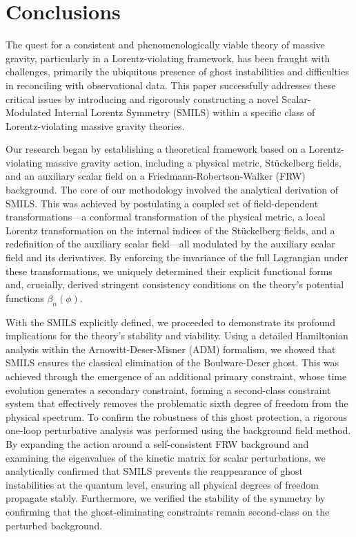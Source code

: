 \documentclass[twocolumn]{aastex631}
\begin{document}
\section{Conclusions}
\label{sec:conclusions}
The quest for a consistent and phenomenologically viable theory of massive gravity, particularly in a Lorentz-violating framework, has been fraught with challenges, primarily the ubiquitous presence of ghost instabilities and difficulties in reconciling with observational data. This paper successfully addresses these critical issues by introducing and rigorously constructing a novel Scalar-Modulated Internal Lorentz Symmetry (SMILS) within a specific class of Lorentz-violating massive gravity theories.

Our research began by establishing a theoretical framework based on a Lorentz-violating massive gravity action, including a physical metric, Stückelberg fields, and an auxiliary scalar field on a Friedmann-Robertson-Walker (FRW) background. The core of our methodology involved the analytical derivation of SMILS. This was achieved by postulating a coupled set of field-dependent transformations—a conformal transformation of the physical metric, a local Lorentz transformation on the internal indices of the Stückelberg fields, and a redefinition of the auxiliary scalar field—all modulated by the auxiliary scalar field and its derivatives. By enforcing the invariance of the full Lagrangian under these transformations, we uniquely determined their explicit functional forms and, crucially, derived stringent consistency conditions on the theory's potential functions $\beta_n(\phi)$.

With the SMILS explicitly defined, we proceeded to demonstrate its profound implications for the theory's stability and viability. Using a detailed Hamiltonian analysis within the Arnowitt-Deser-Misner (ADM) formalism, we showed that SMILS ensures the classical elimination of the Boulware-Deser ghost. This was achieved through the emergence of an additional primary constraint, whose time evolution generates a secondary constraint, forming a second-class constraint system that effectively removes the problematic sixth degree of freedom from the physical spectrum. To confirm the robustness of this ghost protection, a rigorous one-loop perturbative analysis was performed using the background field method. By expanding the action around a self-consistent FRW background and examining the eigenvalues of the kinetic matrix for scalar perturbations, we analytically confirmed that SMILS prevents the reappearance of ghost instabilities at the quantum level, ensuring all physical degrees of freedom propagate stably. Furthermore, we verified the stability of the symmetry by confirming that the ghost-eliminating constraints remain second-class on the perturbed background.
\end{document}
